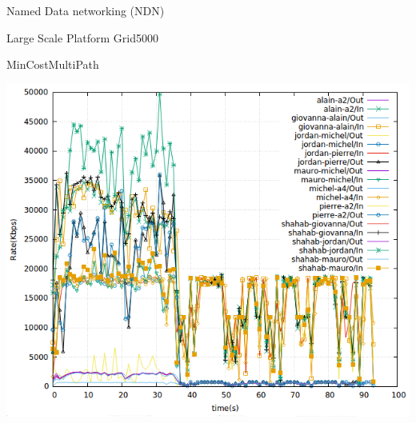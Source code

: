 \documentclass[8pt]{beamer}
\newcommand{\1}{\mathbbm 1}
\begin{document}
\begin{frame}{Named Data networking (NDN)}
\begin{frame}{Large Scale Platform Grid5000}
\begin{frame}{MinCostMultiPath}
{\includegraphics[scale=0.21]{figures/mincostmultipath_big.png} 

}


\end{frame}
\end{frame}
\end{frame}
\end{document}
